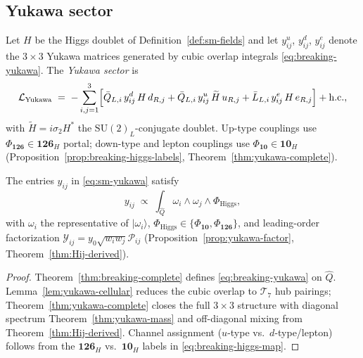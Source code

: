 \subsection{Yukawa sector}
\label{sec:sm-lagrangian:yukawa}

\begin{definition}\label{def:sm-yukawa}
Let $H$ be the Higgs doublet of Definition~\ref{def:sm-fields} and let
$y_{ij}^{u}$, $y_{ij}^{d}$, $y_{ij}^{e}$ denote the $3\times3$ Yukawa matrices
generated by cubic overlap integrals \eqref{eq:breaking-yukawa}. The
\emph{Yukawa sector} is
\begin{equation}\label{eq:sm-yukawa}
  \mathcal{L}_{\mathrm{Yukawa}}
  \;=\;
  -\sum_{i,j=1}^{3}
  \Bigl[
    \bar Q_{L,i}\,y_{ij}^{d}\,H\,d_{R,j}
    + \bar Q_{L,i}\,y_{ij}^{u}\,\widetilde{H}\,u_{R,j}
    + \bar L_{L,i}\,y_{ij}^{e}\,H\,e_{R,j}
  \Bigr]
  + \mathrm{h.c.},
\end{equation}
with $\widetilde{H}=i\sigma_2 H^*$ the $\mathrm{SU}(2)_L$-conjugate doublet.
Up-type couplings use $\Phi_{\mathbf{126}}\in\mathbf{126}_H$ portal;
down-type and lepton couplings use $\Phi_{\mathbf{10}}\in\mathbf{10}_H$
(Proposition~\ref{prop:breaking-higgs-labels}, Theorem~\ref{thm:yukawa-complete}).
\end{definition}

\begin{lemma}
\label{lem:sm-yukawa-derived}
The entries $y_{ij}$ in \eqref{eq:sm-yukawa} satisfy
\begin{equation}\label{eq:sm-yukawa-overlap}
  y_{ij}
  \;\propto\;
  \int_{\hat Q}\omega_i\wedge\omega_j\wedge\Phi_{\mathrm{Higgs}},
\end{equation}
with $\omega_i$ the representative of $|\omega_i\rangle$,
$\Phi_{\mathrm{Higgs}}\in\{\Phi_{\mathbf{10}},\Phi_{\mathbf{126}}\}$, and
leading-order factorization
$\mathcal{Y}_{ij}=y_0\sqrt{w_iw_j}\mathcal{P}_{ij}$
(Proposition~\ref{prop:yukawa-factor}, Theorem~\ref{thm:Hij-derived}).
\end{lemma}

\begin{proof}
Theorem~\ref{thm:breaking-complete} defines \eqref{eq:breaking-yukawa} on
$\hat Q$. Lemma~\ref{lem:yukawa-cellular} reduces the cubic overlap to
$\mathcal{T}_7$ hub pairings; Theorem~\ref{thm:yukawa-complete} closes the
full $3\times3$ structure with diagonal spectrum
Theorem~\ref{thm:yukawa-mass} and off-diagonal mixing from
Theorem~\ref{thm:Hij-derived}. Channel assignment
($u$-type vs.\ $d$-type/lepton) follows from the $\mathbf{126}_H$ vs.\
$\mathbf{10}_H$ labels in \eqref{eq:breaking-higgs-map}.
\end{proof}

